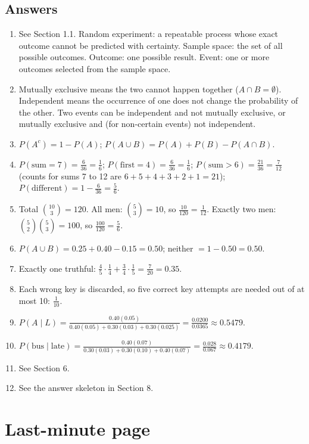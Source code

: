 \documentclass[11pt,a4paper]{article}
\begin{document}
\subsection*{Answers}
\begin{enumerate}
\item See Section 1.1. Random experiment: a repeatable process whose exact outcome cannot be predicted with certainty. Sample space: the set of all possible outcomes. Outcome: one possible result. Event: one or more outcomes selected from the sample space.
\item Mutually exclusive means the two cannot happen together ($A\cap B=\emptyset$). Independent means the occurrence of one does not change the probability of the other. Two events can be independent and not mutually exclusive, or mutually exclusive and (for non-certain events) not independent.
\item $P(A^c)=1-P(A)$; $P(A\cup B)=P(A)+P(B)-P(A\cap B)$.
\item $P(\text{sum}=7)=\frac6{36}=\frac16$; $P(\text{first}=4)=\frac6{36}=\frac16$; $P(\text{sum}>6)=\frac{21}{36}=\frac7{12}$ (counts for sums 7 to 12 are $6+5+4+3+2+1=21$); $P(\text{different})=1-\frac6{36}=\frac56$.
\item Total $\binom{10}{3}=120$. All men: $\binom53=10$, so $\frac{10}{120}=\frac1{12}$. Exactly two men: $\binom52\binom53=100$, so $\frac{100}{120}=\frac56$.
\item $P(A\cup B)=0.25+0.40-0.15=0.50$; neither $=1-0.50=0.50$.
\item Exactly one truthful: $\frac45\cdot\frac14+\frac34\cdot\frac15=\frac7{20}=0.35$.
\item Each wrong key is discarded, so five correct key attempts are needed out of at most 10: $\frac{1}{10}$.
\item $P(A\mid L)=\frac{0.40(0.05)}{0.40(0.05)+0.30(0.03)+0.30(0.025)}=\frac{0.0200}{0.0365}\approx0.5479$.
\item $P(\text{bus}\mid\text{late})=\frac{0.40(0.07)}{0.30(0.03)+0.30(0.10)+0.40(0.07)}=\frac{0.028}{0.067}\approx0.4179$.
\item See Section 6.
\item See the answer skeleton in Section 8.
\end{enumerate}

\section{Last-minute page}
\end{document}
